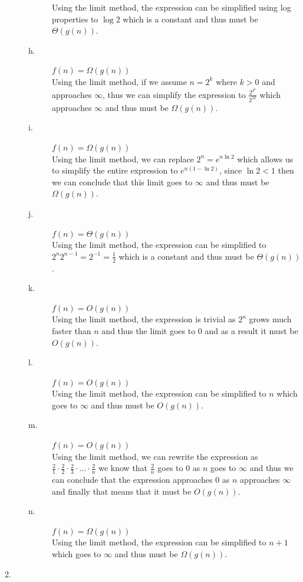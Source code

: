 \documentclass[paper=a4, fontsize=11pt]{scrartcl} %
\numberwithin{equation}{section} %
\numberwithin{figure}{section} %
\numberwithin{table}{section} %
\begin{document}
\begin{description}
\begin{description}
            Using the limit method, the expression can be simplified using log properties to $\log{2}$ which is a constant
            and thus must be $\Theta(g(n))$.
        \item[h.] $f(n) = \Omega(g(n))$ \\
            Using the limit method, if we assume $n = 2^k$ where $k > 0$ and approaches $\infty$, thus we can simplify the expression
            to $\frac{ 2^{2^{k}} }{ 2^{5k} }$ which approaches $\infty$ and thus must be $\Omega(g(n))$.
        \item[i.] $f(n) = \Omega(g(n))$ \\
            Using the limit method, we can replace $2^n = e^{n\ln{2}}$ which allows us to simplify the entire expression to
            $e^{n(1 - \ln{2})}$, since $\ln{2} < 1$ then we can conclude that this limit goes to $\infty$ and thus must be
            $\Omega(g(n))$.
        \item[j.] $f(n) = \Theta(g(n))$ \\
            Using the limit method, the expression can be simplified to $2^n2^{n - 1} = 2^{-1} = \frac{ 1 }{ 2 }$ which is a constant
            and thus must be $\Theta(g(n))$.
        \item[k.] $f(n) = O(g(n))$ \\
            Using the limit method, the expression is trivial as $2^n$ grows much faster than $n$ and thus the limit goes to 0 and as
            a result it must be $O(g(n))$.
        \item[l.] $f(n) = O(g(n))$ \\
            Using the limit method, the expression can be simplified to $n$ which goes to $\infty$ and thus must be $O(g(n))$.
        \item[m.] $f(n) = O(g(n))$ \\
            Using the limit method, we can rewrite the expression as $\frac{2}{1} \cdot \frac{2}{2} \cdot \frac{2}{3} \cdot \ldots \cdot \frac{2}{n}$
            we know that $\frac{2}{n}$ goes to 0 as $n$ goes to $\infty$ and thus we can conclude that the expression approaches 0 as $n$
            approaches $\infty$ and finally that means that it must be $O(g(n))$.
        \item[n.] $f(n) = \Omega(g(n))$ \\
            Using the limit method, the expression can be simplified to $n + 1$ which goes to $\infty$ and thus must be $\Omega(g(n))$.
        \end{description}
    \item[2.] \hfill \\

\end{description}
\end{document}
